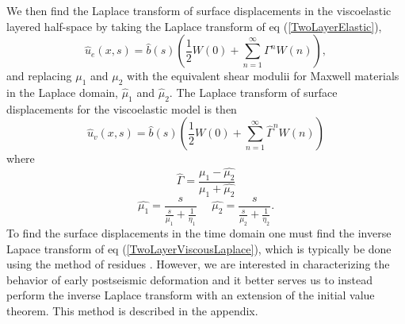 \documentclass[12pt]{article}
\begin{document}
We then find the Laplace transform of surface displacements in the
viscoelastic layered half-space by taking the Laplace transform of eq
(\ref{TwoLayerElastic}), 
\begin{equation}\label{TwoLayerElasticLaplace}
 \hat{u}_e(x,s) = \hat{b}(s)\left(\frac{1}{2} W(0) +\sum_{n=1}^\infty\Gamma^nW(n)\right),
\end{equation}
and replacing $\mu_1$ and $\mu_2$ with the
equivalent shear modulii for Maxwell materials in the Laplace domain,
$\hat{\mu}_1$ and $\hat{\mu}_2$.  The Laplace transform of surface
displacements for the viscoelastic model is then
\begin{equation}\label{TwoLayerViscousLaplace}
 \hat{u}_v(x,s) = \hat{b}(s)\left(\frac{1}{2}W(0) +\sum_{n=1}^\infty\hat{\Gamma}^nW(n)\right)
\end{equation}
where
\begin{equation}
  \hat{\Gamma} = \frac{\hat{\mu_1} - \hat{\mu_2}}{\hat{\mu_1} + \hat{\mu_2}}
\end{equation}
\begin{equation}
  \hat{\mu_1} = \frac{s}{\frac{s}{\mu_1} + \frac{1}{\eta_1}} \,\,\,\,\,\,\,\,  
  \hat{\mu_2} = \frac{s}{\frac{s}{\mu_2} + \frac{1}{\eta_2}}.
\end{equation}
To find the surface displacements in the time domain one must find the
inverse Lapace transform of eq (\ref{TwoLayerViscousLaplace}), which
is typically be done using the method of residues
\citep[e.g.][]{NM1974}. However, we are interested in characterizing
the behavior of early postseismic deformation and it better serves
us to instead perform the inverse Laplace transform with an extension
of the initial value theorem. This method is described in the
appendix.
\end{document}

